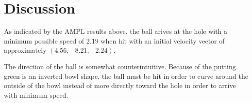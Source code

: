 \documentclass{article}
\begin{document}
\section{Discussion}\label{Discussion}

As indicated by the AMPL results above, the ball arives at the hole with a minimum possible speed of \(2.19\) when hit with an initial velocity vector of approximately \(\left( 4.56, -8.21, -2.24 \right)\).

The direction of the ball is somewhat counterintuitive. Because of the putting green is an inverted bowl shape, the ball must be hit in order to curve around the outside of the bowl instead of more directly toward the hole in order to arrive with minimum speed.
\end{document}
